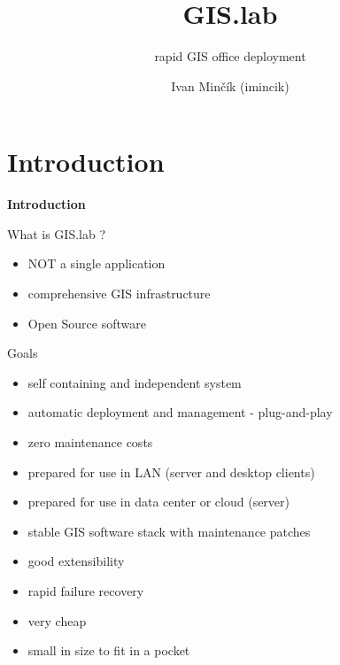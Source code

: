 \documentclass[12pt]{beamer}
\title{GIS.lab}
\subtitle{rapid GIS office deployment}
\author{Ivan Minčík (imincik)}
\institute{FOSS4G-Europe 2014, Bremen}
\date{}
\begin{document}
\begin{frame}
	\titlepage
\end{frame}


\section{Introduction}
\begin{frame}
	\begin{center}
		\LARGE\textbf{Introduction}	
	\end{center}
\end{frame}


\begin{frame}{What is GIS.lab ?}
	\begin{itemize}[<+->]
		\item NOT a single application
		\item comprehensive GIS infrastructure
		\item Open Source software
	\end{itemize}
\end{frame}


\begin{frame}{Goals}
	\begin{itemize}[<+->]
		\item self containing and independent system
		\item automatic deployment and management - plug-and-play
		\item zero maintenance costs
		\item prepared for use in LAN (server and desktop clients)
		\item prepared for use in data center or cloud (server)
		\item stable GIS software stack with maintenance patches
		\item good extensibility
		\item rapid failure recovery	
		\item very cheap
		\item small in size to fit in a pocket
	\end{itemize}
\end{frame}
\end{document}

